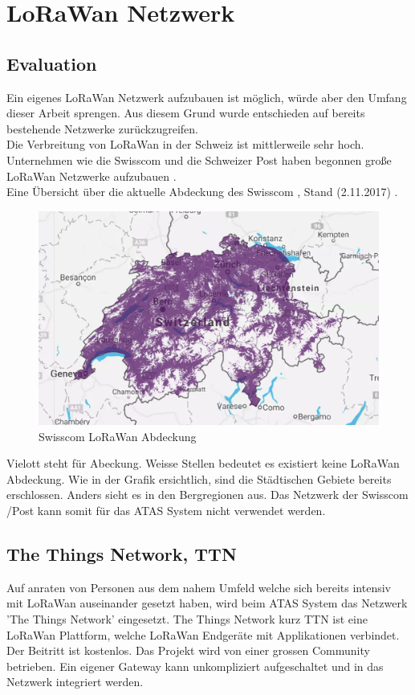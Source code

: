 \documentclass[11pt,english,german]{report}
\theoremstyle{definition}
\begin{document}
\newpage
\section{LoRaWan Netzwerk}
\subsection{Evaluation}
Ein eigenes LoRaWan Netzwerk aufzubauen ist möglich, würde aber den Umfang dieser Arbeit sprengen. Aus diesem Grund wurde entschieden auf bereits bestehende Netzwerke zurückzugreifen.\\[0.3cm]
Die Verbreitung von LoRaWan in der Schweiz ist mittlerweile sehr hoch. Unternehmen wie die Swisscom und die Schweizer Post haben begonnen große LoRaWan Netzwerke aufzubauen \cite{swisscompost}.\\[0.3cm]
Eine Übersicht über die aktuelle Abdeckung des Swisscom , Stand (2.11.2017)  \cite{swisscomcoverage}.
\begin{figure}[H]
	\centering
	\includegraphics[width=\textwidth]{img/swisscomlorawan.png}
	\caption[Swisscom LoRaWan Abdeckung]
	{Swisscom LoRaWan Abdeckung}
\end{figure}
\noindent
Vielott steht für Abeckung. Weisse Stellen bedeutet es existiert keine LoRaWan Abdeckung. Wie in der Grafik ersichtlich, sind die Städtischen Gebiete bereits erschlossen. Anders sieht es in den Bergregionen aus. Das Netzwerk der Swisscom /Post kann somit für das ATAS System nicht verwendet werden.\

\newpage
\subsection{The Things Network, TTN}
Auf anraten von Personen aus dem nahem Umfeld welche sich bereits intensiv mit LoRaWan auseinander gesetzt haben, wird beim ATAS System das Netzwerk 'The Things Network' eingesetzt. The Things Network kurz TTN ist eine LoRaWan Plattform, welche LoRaWan Endgeräte mit Applikationen verbindet. Der Beitritt ist kostenlos. Das Projekt wird von einer grossen Community betrieben. Ein eigener Gateway kann unkompliziert aufgeschaltet und in das Netzwerk integriert werden. 
\end{document}
